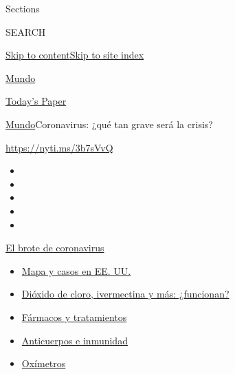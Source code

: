 Sections

SEARCH

\protect\hyperlink{site-content}{Skip to
content}\protect\hyperlink{site-index}{Skip to site index}

\href{https://www.nytimes.com/es/section/mundo}{Mundo}

\href{https://myaccount.nytimes.com/auth/login?response_type=cookie\&client_id=vi}{}

\href{https://www.nytimes.com/section/todayspaper}{Today's Paper}

\href{/es/section/mundo}{Mundo}\textbar{}Coronavirus: ¿qué tan grave
será la crisis?

\url{https://nyti.ms/3b7sVvQ}

\begin{itemize}
\item
\item
\item
\item
\item
\end{itemize}

\href{https://www.nytimes.com/es/spotlight/coronavirus?action=click\&pgtype=Article\&state=default\&region=TOP_BANNER\&context=storylines_menu}{El
brote de coronavirus}

\begin{itemize}
\tightlist
\item
  \href{https://www.nytimes.com/es/interactive/2020/espanol/mundo/coronavirus-en-estados-unidos.html?action=click\&pgtype=Article\&state=default\&region=TOP_BANNER\&context=storylines_menu}{Mapa
  y casos en EE. UU.}
\item
  \href{https://www.nytimes.com/es/2020/07/23/espanol/america-latina/bolivia-cloro-coronavirus-ivermectina.html?action=click\&pgtype=Article\&state=default\&region=TOP_BANNER\&context=storylines_menu}{Dióxido
  de cloro, ivermectina y más: ¿funcionan?}
\item
  \href{https://www.nytimes.com/es/interactive/2020/science/coronavirus-tratamientos-curas.html?action=click\&pgtype=Article\&state=default\&region=TOP_BANNER\&context=storylines_menu}{Fármacos
  y tratamientos}
\item
  \href{https://www.nytimes.com/es/2020/07/28/espanol/ciencia-y-tecnologia/anticuerpos-coronavirus-inmunidad.html?action=click\&pgtype=Article\&state=default\&region=TOP_BANNER\&context=storylines_menu}{Anticuerpos
  e inmunidad}
\item
  \href{https://www.nytimes.com/es/2020/04/29/espanol/estilos-de-vida/oximetro-para-que-sirve.html?action=click\&pgtype=Article\&state=default\&region=TOP_BANNER\&context=storylines_menu}{Oxímetros}
\end{itemize}

